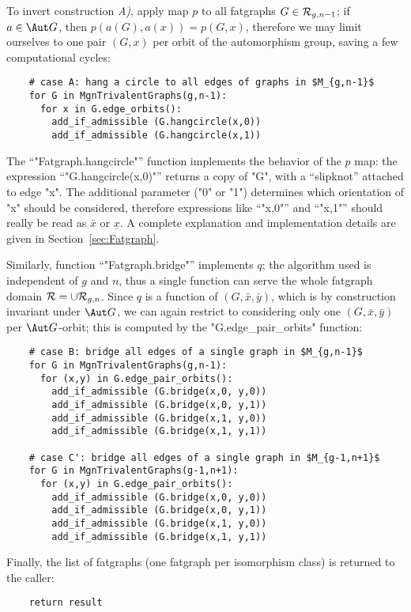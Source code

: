 To invert construction {\slshape A)}, apply map $p$ to all fatgraphs $G \in
\mathcal{R}_{g,n-1}$; if $a \in \Aut G$, then $p(a(G), a(x)) = p(G, x)$,
therefore we may limit ourselves to one pair $(G,x)$ per orbit of the
automorphism group, saving a few computational cycles:
\begin{lstlisting}
    # case A: hang a circle to all edges of graphs in $M_{g,n-1}$
    for G in MgnTrivalentGraphs(g,n-1):
      for x in G.edge_orbits():
        add_if_admissible (G.hangcircle(x,0))
        add_if_admissible (G.hangcircle(x,1))

\end{lstlisting}
The ``"Fatgraph.hangcircle"'' function implements the behavior of the
$p$ map: the expression ``"G.hangcircle(x,0)"'' returns a copy of
"G", with a ``slipknot'' attached to edge "x".  The additional
parameter ("0" or "1") determines which orientation of "x"
should be considered, therefore expressions like ``"x,0"'' and
``"x,1"'' should really be read as $\bar{x}$ or $\underline{x}$. A
complete explanation and implementation details are given in
Section~\ref{sec:Fatgraph}.

Similarly, function ``"Fatgraph.bridge"'' implements $q$;
the algorithm used is independent of $g$ and $n$, thus a single
function can serve the whole fatgraph domain $\mathcal{R} = \cup
\mathcal{R}_{g,n}$. Since $q$ is a function of $(G, \bar{x}, \bar{y})$, which
is by construction invariant under $\Aut G$, we can again restrict
to considering only one $(G, \bar{x}, \bar{y})$ per $\Aut G$-orbit;
this is computed by the "G.edge_pair_orbits" function:
\begin{lstlisting}
    # case B: bridge all edges of a single graph in $M_{g,n-1}$
    for G in MgnTrivalentGraphs(g,n-1):
      for (x,y) in G.edge_pair_orbits():
        add_if_admissible (G.bridge(x,0, y,0))
        add_if_admissible (G.bridge(x,0, y,1))
        add_if_admissible (G.bridge(x,1, y,0))
        add_if_admissible (G.bridge(x,1, y,1))

    # case C': bridge all edges of a single graph in $M_{g-1,n+1}$
    for G in MgnTrivalentGraphs(g-1,n+1):
      for (x,y) in G.edge_pair_orbits():
        add_if_admissible (G.bridge(x,0, y,0))
        add_if_admissible (G.bridge(x,0, y,1))
        add_if_admissible (G.bridge(x,1, y,0))
        add_if_admissible (G.bridge(x,1, y,1))

\end{lstlisting}

Finally, the list of fatgraphs (one fatgraph per isomorphism class) is
returned to the caller:
\begin{lstlisting}
    return result
\end{lstlisting}


